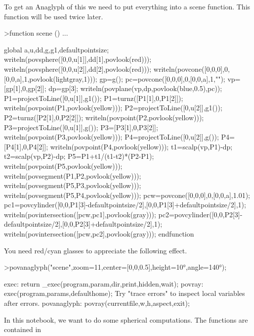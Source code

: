 \documentclass[a4paper,10pt]{article}
\begin{document}
\begin{eulernotebook}
\begin{eulercomment}
\begin{eulercomment}
\begin{eulercomment}
\begin{eulercomment}
\begin{eulercomment}
\begin{eulercomment}
\begin{eulercomment}
To get an Anaglyph of this we need to put everything into a scene
function. This function will be used twice later.
\end{eulercomment}
\begin{eulerprompt}
>function scene () ...
\end{eulerprompt}
\begin{eulerudf}
  global a,u,dd,g,g1,defaultpointsize;
  writeln(povsphere([0,0,u[1]],dd[1],povlook(red)));
  writeln(povsphere([0,0,u[2]],dd[2],povlook(red)));
  writeln(povcone([0,0,0],0,[0,0,a],1,povlook(lightgray,1)));
  gp=g();
  pc=povcone([0,0,0],0,[0,0,a],1,"");
  vp=[gp[1],0,gp[2]]; dp=gp[3];
  writeln(povplane(vp,dp,povlook(blue,0.5),pc));
  P1=projectToLine([0,u[1]],g1()); P1=turnz([P1[1],0,P1[2]]);
  writeln(povpoint(P1,povlook(yellow)));
  P2=projectToLine([0,u[2]],g1()); P2=turnz([P2[1],0,P2[2]]);
  writeln(povpoint(P2,povlook(yellow)));
  P3=projectToLine([0,u[1]],g()); P3=[P3[1],0,P3[2]];
  writeln(povpoint(P3,povlook(yellow)));
  P4=projectToLine([0,u[2]],g()); P4=[P4[1],0,P4[2]];
  writeln(povpoint(P4,povlook(yellow)));
  t1=scalp(vp,P1)-dp; t2=scalp(vp,P2)-dp; P5=P1+t1/(t1-t2)*(P2-P1);
  writeln(povpoint(P5,povlook(yellow)));
  writeln(povsegment(P1,P2,povlook(yellow)));
  writeln(povsegment(P5,P3,povlook(yellow)));
  writeln(povsegment(P5,P4,povlook(yellow)));
  pcw=povcone([0,0,0],0,[0,0,a],1.01);
  pc1=povcylinder([0,0,P1[3]-defaultpointsize/2],[0,0,P1[3]+defaultpointsize/2],1);
  writeln(povintersection([pcw,pc1],povlook(gray)));
  pc2=povcylinder([0,0,P2[3]-defaultpointsize/2],[0,0,P2[3]+defaultpointsize/2],1);
  writeln(povintersection([pcw,pc2],povlook(gray)));
  endfunction
\end{eulerudf}
\begin{eulercomment}
You need red/cyan glasses to appreciate the following effect.
\end{eulercomment}
\begin{eulerprompt}
>povanaglyph("scene",zoom=11,center=[0,0,0.5],height=10°,angle=140°);
\end{eulerprompt}
\begin{euleroutput}
  exec:
      return _exec(program,param,dir,print,hidden,wait);
  povray:
      exec(program,params,defaulthome);
  Try "trace errors" to inspect local variables after errors.
  povanaglyph:
      povray(currentfile,w,h,aspect,exit); 
\end{euleroutput}
\begin{eulercomment}
In this notebook, we want to do some spherical computations. The functions are contained in

\end{eulercomment}
\end{eulercomment}
\end{eulercomment}
\end{eulercomment}
\end{eulercomment}
\end{eulercomment}
\end{eulercomment}
\end{eulernotebook}
\end{document}
